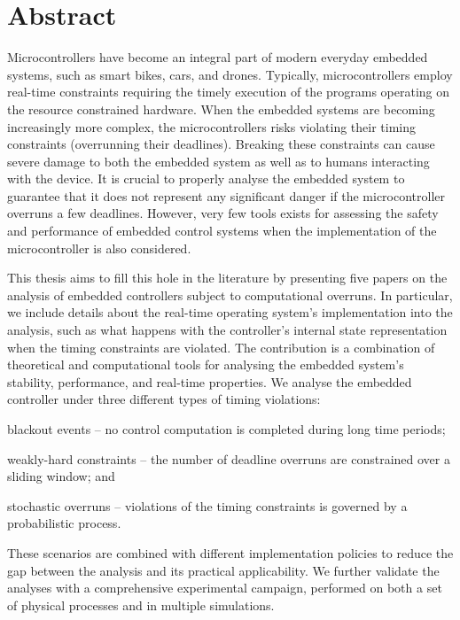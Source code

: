 \chapter*{Abstract}

Microcontrollers have become an integral part of modern everyday embedded systems, such as smart bikes, cars, and drones.
Typically, microcontrollers employ real-time constraints requiring the timely execution of the programs operating on the resource constrained hardware.
When the embedded systems are becoming increasingly more complex, the microcontrollers risks violating their timing constraints (overrunning their deadlines).
Breaking these constraints can cause severe damage to both the embedded system as well as to humans interacting with the device.
It is crucial to properly analyse the embedded system to guarantee that it does not represent any significant danger if the microcontroller overruns a few deadlines.
However, very few tools exists for assessing the safety and performance of embedded control systems when the implementation of the microcontroller is also considered.

This thesis aims to fill this hole in the literature by presenting five papers on the analysis of embedded controllers subject to computational overruns.
In particular, we include details about the real-time operating system's implementation into the analysis, such as what happens with the controller's internal state representation when the timing constraints are violated.
The contribution is a combination of theoretical and computational tools for analysing the embedded system's stability, performance, and real-time properties.
We analyse the embedded controller under three different types of timing violations:
%
\begin{enumerate*}[label=(\roman*)]
    \item blackout events -- no control computation is completed during long time periods;
    \item weakly-hard constraints -- the number of deadline overruns are constrained over a sliding window; and
    \item stochastic overruns -- violations of the timing constraints is governed by a probabilistic process.
\end{enumerate*}
%
These scenarios are combined with different implementation policies to reduce the gap between the analysis and its practical applicability.
We further validate the analyses with a comprehensive experimental campaign, performed on both a set of physical processes and in multiple simulations.

